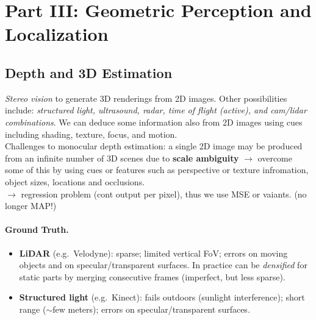 \documentclass{article}
\begin{document}
\newpage
\section{Part III: Geometric Perception and Localization}
\subsection{Depth and 3D Estimation}
\textit{Stereo vision} to generate 3D renderings from 2D images. Other possibilities include: \textit{structured light, ultrasound, radar, time of flight (active), and cam/lidar combinations}.
We can deduce some information also from 2D images using cues including shading, texture, focus, and motion. \\

Challenges to monocular depth estimation: a single 2D image may be produced from an infinite number of 3D scenes due to \textbf{scale ambiguity} $\rightarrow$ overcome some of this by using cues or features such as perspective or texture infromation, object sizes, locations and occlusions. \\

$\rightarrow$ regression problem (cont output per pixel), thus we use MSE or vaiants. (no longer MAP!)

\paragraph{Ground Truth.}
\begin{itemize}
    \item \textbf{LiDAR} (e.g.\ Velodyne): sparse; limited vertical FoV; errors on moving objects and on specular/transparent surfaces. In practice can be \textit{densified} for static parts by merging consecutive frames (imperfect, but less sparse).
    \item \textbf{Structured light} (e.g.\ Kinect): fails outdoors (sunlight interference); short range ($\sim$few meters); errors on specular/transparent surfaces.
\end{itemize}
\end{document}
